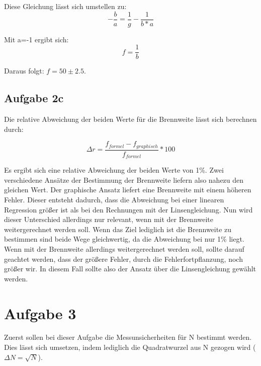 \documentclass[titlepage=firstcover, captions=tableheading]{scrartcl}
\begin{document}
Diese Gleichung lässt sich umstellen zu:
\begin{displaymath}
    -\frac{b}{a} = \frac{1}{g} - \frac{1}{b*a}
\end{displaymath}

Mit a=-1 ergibt sich:
\begin{displaymath}
    f = \frac{1}{b}
\end{displaymath}

Daraus folgt: $f=50\pm2.5$.

\subsection{Aufgabe 2c}

Die relative Abweichung der beiden Werte für die Brennweite lässt sich berechnen durch:

\begin{displaymath}
    \Delta r = \frac{f_{formel}-f_{graphisch}}{f_{formel}}*100
\end{displaymath}

\noindent Es ergibt sich eine relative Abweichung der beiden Werte von 1\%.
Zwei verschiedene Ansätze der Bestimmung der Brennweite liefern also nahezu den gleichen Wert.
Der graphische Ansatz liefert eine Brennweite mit einem höheren Fehler.
Dieser entsteht dadurch, dass die Abweichung bei einer linearen Regression größer ist als bei den Rechnungen mit der Linsengleichung.
Nun wird dieser Unterschied allerdings nur relevant, wenn mit der Brennweite weitergerechnet werden soll.
Wenn das Ziel lediglich ist die Brennweite zu bestimmen sind beide Wege gleichwertig, da die Abweichung bei nur 1\% liegt.
Wenn mit der Brennweite allerdings weitergerechnet werden soll, sollte darauf geachtet werden, dass der größere Fehler, durch die Fehlerfortpflanzung,
noch größer wir. 
In diesem Fall sollte also der Ansatz über die Linsengleichung gewählt werden.

\section{Aufgabe 3}

Zuerst sollen bei dieser Aufgabe die Messunsicherheiten für N bestimmt werden.
Dies lässt sich umsetzen, indem lediglich die Quadratwurzel aus N gezogen wird ($\Delta N = \sqrt{N}$).
\end{document}
